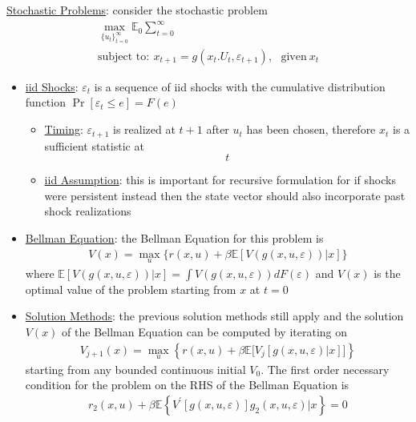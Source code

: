 \documentclass{article}
\begin{document}
\vspace{2.5mm}
\par \underline{Stochastic Problems}: consider the stochastic problem
\begin{gather*}
\max_{\{ u_{t} \} ^{\infty}_{t=0}} \mathbb{E}_{0} \sum_{t=0}^{\infty} \\
\text{subject to}: \ x_{t+1} = g(x_{t}. U_{t}, \varepsilon_{t+1}), \ \ \ \text{given} \ x_{t}
\end{gather*}
\begin{itemize}
    \item  \underline{iid Shocks}: $\varepsilon_{t}$ is a sequence of iid shocks with the cumulative distribution function $\Pr [\varepsilon_{t} \leq e ] = F(e)$
    \begin{itemize}
        \item \underline{Timing}: $\varepsilon_{t+1}$ is realized at $t+1$ after $u_{t}$ has been chosen, therefore $x_{t}$ is a sufficient statistic at $$t$$
        \item \underline{iid Assumption}: this is important for recursive formulation for if shocks were persistent instead then the state vector should also incorporate past shock realizations
    \end{itemize}
    \item \underline{Bellman Equation}: the Bellman Equation for this problem is
    \begin{gather*}
        V(x) = \max_{u} \{ r(x,u) + \beta \mathbb{E}[V(g(x,u, \varepsilon))|x] \}
    \end{gather*}
    where $\mathbb{E} [V(g(x, u, \varepsilon))|x ] = \int V(g(x,u,\varepsilon))dF(\varepsilon)$ and $V(x)$ is the optimal value of the problem starting from $x$ at $t=0$
    \item \underline{Solution Methods}: the previous solution methods still apply and the solution $V(x)$ of the Bellman Equation can be computed by iterating on
    \begin{gather*}
        V_{j+1}(x) = \max_{u} \left\{r(x,u) + \beta \mathbb{E} \bigg[ V_{j}[g(x,u,\varepsilon) | x] \bigg] \right\}
    \end{gather*}
    starting from any bounded continuous initial $V_{0}$.
    The first order necessary condition for the problem on the RHS of the Bellman Equation is
    \begin{gather*}
        r_{2}(x,u) + \beta \mathbb{E} \left\{V^{'} [g (x, u, \varepsilon)] g_{2}(x,u,\varepsilon) | x \right\} = 0
    \end{gather*}

\end{itemize}
\end{document}
